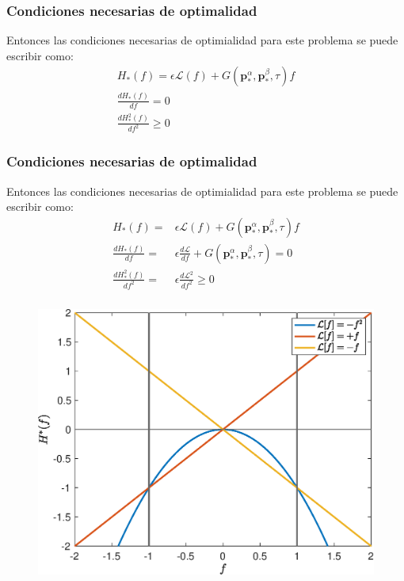 \begin{frame}
    \frametitle{Condiciones necesarias de optimalidad}
    Entonces las condiciones necesarias de optimialidad para este problema se puede escribir como:
    \begin{gather}\label{hamil}
        H_*(f) = \epsilon \mathcal{L}(f) + 
        G(\bm{p}^\alpha_*,\bm{p}^\beta_*,\tau) f \\
        \frac{dH_*(f)}{df} = 0 \\
        \frac{dH_*^2(f)}{df^2} \geq 0 
    \end{gather}

\end{frame}

\begin{frame}
    \frametitle{Condiciones necesarias de optimalidad}
    Entonces las condiciones necesarias de optimialidad para este problema se puede escribir como:
    \begin{align}\label{hamil}
        H_*(f) = & \epsilon \mathcal{L}(f) + 
        G(\bm{p}^\alpha_*,\bm{p}^\beta_*,\tau) f \\
        \frac{dH_*(f)}{df} =  & \epsilon\frac{d\mathcal{L}}{df} + G(\bm{p}^\alpha_*,\bm{p}^\beta_*,\tau) = 0\\
        \frac{dH_*^2(f)}{df^2} = &  \epsilon \frac{d\mathcal{L}^2}{df^2}\geq 0 
    \end{align}

\end{frame}

\begin{frame}
    \frametitle{}
    \begin{figure}
        \includegraphics[scale=0.45]{imgs/bang-bang.eps}
    \end{figure}
\end{frame}

